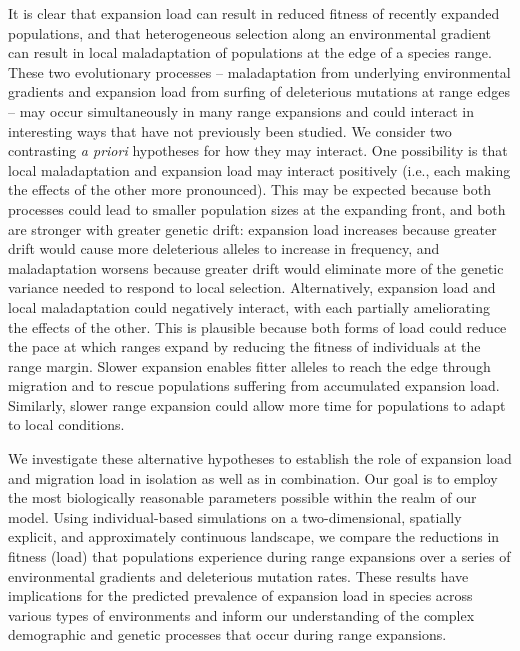 It is clear that expansion load can result in reduced fitness of recently expanded populations, and that heterogeneous selection along an environmental gradient can result in local maladaptation of populations at the edge of a species range. These two evolutionary processes -- maladaptation from underlying environmental gradients and expansion load from surfing of deleterious mutations at range edges -- may occur simultaneously in many range expansions and could interact in interesting ways that have not previously been studied. We consider two contrasting \emph{a priori} hypotheses for how they may interact. One possibility is that local maladaptation and expansion load may interact positively (i.e., each making the effects of the other more pronounced). This may be expected because both processes could lead to smaller population sizes at the expanding front, and both are stronger with greater genetic drift: expansion load increases because greater drift would cause more deleterious alleles to increase in frequency, and maladaptation worsens because greater drift would eliminate more of the genetic variance needed to respond to local selection. Alternatively, expansion load and local maladaptation could negatively interact, with each partially ameliorating the effects of the other. This is plausible because both forms of load could reduce the pace at which ranges expand by reducing the fitness of individuals at the range margin. Slower expansion enables fitter alleles to reach the edge through migration and to rescue populations suffering from accumulated expansion load. Similarly, slower range expansion could allow more time for populations to adapt to local conditions.

We investigate these alternative hypotheses to establish the role of expansion load and migration load in isolation as well as in combination. Our goal is to employ the most biologically reasonable parameters possible within the realm of our model. Using individual-based simulations on a two-dimensional, spatially explicit, and approximately continuous landscape, we compare the reductions in fitness (load) that populations experience during range expansions over a series of environmental gradients and deleterious mutation rates. These results have implications for the predicted prevalence of expansion load in species across various types of environments and inform our understanding of the complex demographic and genetic processes that occur during range expansions. 


